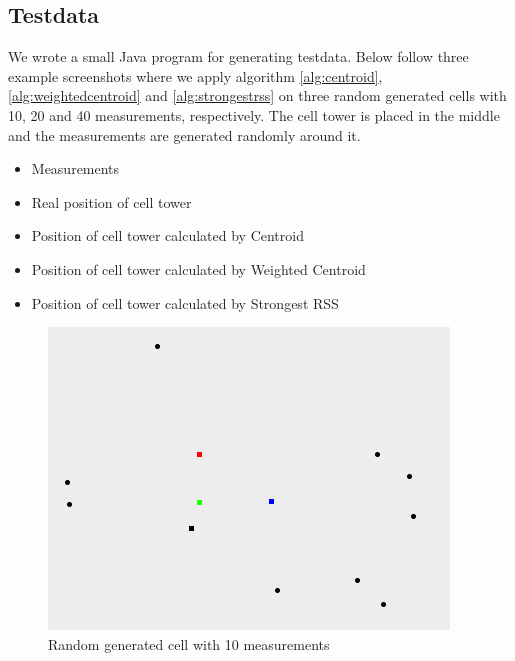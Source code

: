 \documentclass[a4paper, 12pt]{article}
\begin{document}
\subsection{Testdata}
We wrote a small Java program for generating testdata. Below follow three example screenshots where we apply algorithm \ref{alg:centroid}, \ref{alg:weightedcentroid} and \ref{alg:strongestrss} on three random generated cells with 10, 20 and 40 measurements, respectively. The cell tower is placed in the middle and the measurements are generated randomly around it.
\begin{itemize}
\item {} Measurements
\item {} Real position of cell tower
\item {} Position of cell tower calculated by Centroid
\item {} Position of cell tower calculated by Weighted Centroid
\item {} Position of cell tower calculated by Strongest RSS
\end{itemize}

\begin{figure}[h!]
\label{fig:10meas}
  \centering
    \includegraphics[scale=0.8]{testData_10meas.png}
    \caption{Random generated cell with 10 measurements}
\end{figure}
\end{document}
